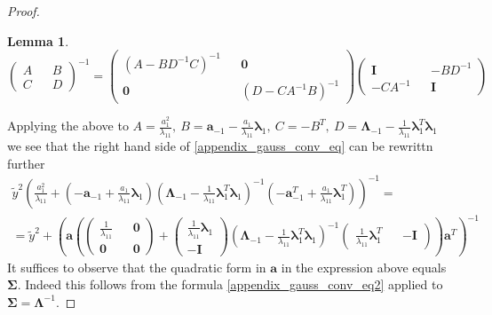 \documentclass[10pt,fleqn]{amsart}
\newtheorem{lemma}[theorem]{Lemma}
\theoremstyle{definition}
\theoremstyle{remark}
\numberwithin{equation}{section}
\newcommand{\aaa}{\boldsymbol{a}}
\newcommand{\SSigma}{\boldsymbol{\Sigma}}
\newcommand{\llambda}{\boldsymbol{\lambda}}
\newcommand{\LLambda}{\boldsymbol{\Lambda}}
\newcommand{\ytilde}{\widetilde{y}}
\begin{document}
\begin{proof}
\begin{lemma}
    \begin{equation}
        \left(\begin{matrix}A&&B\\C&&D\end{matrix}\right)^{-1}=
        \left(\begin{matrix}\left(A-BD^{-1}C\right)^{-1}&&\boldsymbol{0}\\\boldsymbol{0}&&\left(D-CA^{-1}B\right)^{-1}\end{matrix}\right)
        \left(\begin{matrix}\boldsymbol{I}&&-BD^{-1}\\-CA^{-1}&&\boldsymbol{I}\end{matrix}\right)
    \end{equation}
\end{lemma}
Applying the above to
$A=\frac{a_1^2}{\lambda_{11}},\ B=\aaa_{-1}-\frac{a_1}{\lambda_{11}}\llambda_1,\ C=-B^T,\ D=\LLambda_{-1}-\frac 1{\lambda_{11}}\llambda_1^T\llambda_1$
we see that the right hand side of \ref{appendix_gauss_conv_eq} can be rewrittn further
\begin{equation}\begin{split}
    \ytilde^2\left(
        \frac{a_1^2}{\lambda_{11}}+
        \left(-\aaa_{-1}+\frac{a_1}{\lambda_{11}}\llambda_1\right)
        \left(\LLambda_{-1}-\frac 1{\lambda_{11}}\llambda_1^T\llambda_1\right)^{-1}
        \left(-\aaa_{-1}^T+\frac{a_1}{\lambda_{11}}\llambda_1^T\right)
        \right)^{-1}=\\
        =\ytilde^2+\left(\aaa\left(
            \left(\begin{matrix}\frac 1{\lambda_{11}}&&\boldsymbol{0}\\\boldsymbol{0}&&\boldsymbol{0}\end{matrix}\right)+
            \left(\begin{matrix}\frac 1{\lambda_{11}}\llambda_1\\-\boldsymbol{I}\end{matrix}\right)
            \left(\LLambda_{-1}-\frac 1{\lambda_{11}}\llambda_1^T\llambda_1\right)^{-1}
            \left(\begin{matrix}\frac 1{\lambda_{11}}\llambda_1^T&&-\boldsymbol{I}\end{matrix}\right)
            \right)\aaa^T\right)^{-1}
\end{split}\end{equation}
It suffices to observe that the quadratic form in $\aaa$ in the expression above equals $\SSigma$. Indeed this follows from
the formula \ref{appendix_gauss_conv_eq2} applied to $\SSigma=\LLambda^{-1}$.
\end{proof}
\end{document}
